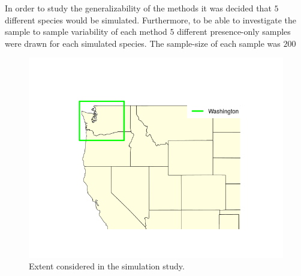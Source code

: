 In order to study the generalizability of the methods it was decided that $5$ different species would be simulated. Furthermore, to be able to investigate the sample to sample variability of each method $5$ different presence-only samples were drawn for each simulated species. The sample-size of each sample was $200$

\begin{figure}[!htb]
\includegraphics[scale=0.5]{Plots/WashingtonPlot.png}
\caption{\label{fig:WashState}Extent considered in the simulation study.}
\end{figure}

